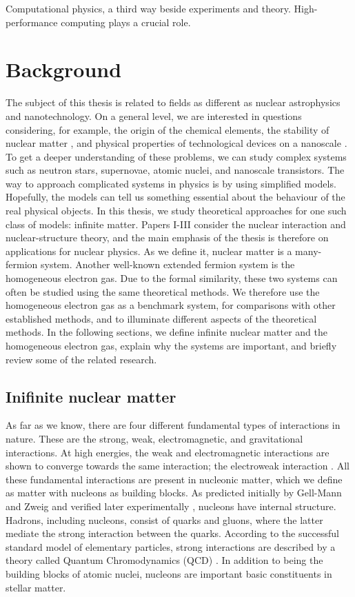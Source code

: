 \documentclass[a4paper,12pt]{report}
\begin{document}
Computational physics, a third way beside experiments and
theory. High-performance computing plays a crucial role.


\chapter{Background}

The subject of this thesis is related to fields as different 
as nuclear astrophysics and nanotechnology. On a general level, we
are interested in questions considering, for example, the origin of 
the chemical elements, the stability of nuclear matter 
\cite{nap_2013}, and
physical properties of technological devices on a nanoscale
\cite{barsan_2010}.
To get a deeper understanding of these problems, we can study 
complex systems such as neutron stars, supernovae, atomic 
nuclei, and nanoscale transistors. The way to approach complicated 
systems in physics is by using simplified models. Hopefully,
the models can tell us something essential about 
the behaviour of the real physical objects. In this thesis,
we study theoretical approaches for one such class of models:
infinite matter. Papers I-III consider the nuclear interaction 
and nuclear-structure theory, and the main emphasis of the
thesis is therefore on applications for nuclear physics. 
As we define it, nuclear matter is a many-fermion system. 
Another well-known extended fermion system is the homogeneous 
electron gas. Due to the formal similarity, these two 
systems can often be studied using the same theoretical methods.  
We therefore use the homogeneous electron gas as a benchmark 
system, for comparisons with other established methods, and
to illuminate different aspects of the theoretical methods. 
In the following sections, we define infinite nuclear matter 
and the homogeneous electron gas, explain why the systems are 
important, and briefly review some of the related research. 
 

\section{Inifinite nuclear matter}


As far as we know, there are four different fundamental 
types of interactions in nature. These are the strong, weak, 
electromagnetic, and gravitational interactions. At high 
energies, the weak and electromagnetic interactions are shown
to converge towards the same interaction; the electroweak 
interaction \cite{mandl_shaw,martin_2009}. All these fundamental
interactions are present in nucleonic matter, which 
we define as matter with nucleons as building blocks.
As predicted initially by Gell-Mann and Zweig and verified 
later experimentally \cite{riordan_1992,martin_2009}, nucleons have
internal structure. Hadrons, including nucleons, consist 
of quarks and gluons, where the latter mediate the strong
interaction between the quarks. According to the successful 
standard model of elementary particles, strong 
interactions are described by a theory 
called Quantum Chromodynamics (QCD) 
\cite{martin_2009,braun_2009}. 
In addition to being the building blocks of atomic nuclei, 
nucleons are important basic constituents in stellar matter.    
\end{document}
